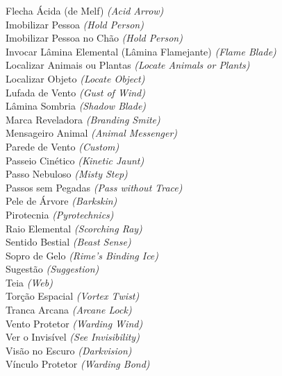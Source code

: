 \documentclass{RPG_Adventure}[2021/10/20]
\begin{document}
{\normalsize Flecha Ácida (de Melf) \textit{(Acid Arrow)}\\ }
{\normalsize Imobilizar Pessoa \textit{(Hold Person)}\\ }
{\normalsize Imobilizar Pessoa no Chão \textit{(Hold Person)}\\ }
{\normalsize Invocar Lâmina Elemental (Lâmina Flamejante) \textit{(Flame Blade)}\\ }
{\normalsize Localizar Animais ou Plantas \textit{(Locate Animals or Plants)}\\ }
{\normalsize Localizar Objeto \textit{(Locate Object)}\\ }
{\normalsize Lufada de Vento \textit{(Gust of Wind)}\\ }
{\normalsize Lâmina Sombria \textit{(Shadow Blade)}\\ }
{\normalsize Marca Reveladora \textit{(Branding Smite)}\\ }
{\normalsize Mensageiro Animal \textit{(Animal Messenger)}\\ }
{\normalsize Parede de Vento \textit{(Custom)}\\ }
{\normalsize Passeio Cinético \textit{(Kinetic Jaunt)}\\ }
{\normalsize Passo Nebuloso \textit{(Misty Step)}\\ }
{\normalsize Passos sem Pegadas \textit{(Pass without Trace)}\\ }
{\normalsize Pele de Árvore \textit{(Barkskin)}\\ }
{\normalsize Pirotecnia \textit{(Pyrotechnics)}\\ }
{\normalsize Raio Elemental \textit{(Scorching Ray)}\\ }
{\normalsize Sentido Bestial \textit{(Beast Sense)}\\ }
{\normalsize Sopro de Gelo \textit{(Rime's Binding Ice)}\\ }
{\normalsize Sugestão \textit{(Suggestion)}\\ }
{\normalsize Teia \textit{(Web)}\\ }
{\normalsize Torção Espacial \textit{(Vortex Twist)}\\ }
{\normalsize Tranca Arcana \textit{(Arcane Lock)}\\ }
{\normalsize Vento Protetor \textit{(Warding Wind)}\\ }
{\normalsize Ver o Invisível \textit{(See Invisibility)}\\ }
{\normalsize Visão no Escuro \textit{(Darkvision)}\\ }
{\normalsize Vínculo Protetor \textit{(Warding Bond)}\\ }
\end{document}
